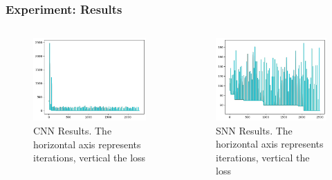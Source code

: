 \begin{frame}
	\frametitle{Experiment: Results}
	\begin{columns}
		\begin{column}{0.5\textwidth}
			\begin{figure}
				\centering
				\includegraphics[width=\linewidth]{images/cnnResults}
				\caption[CNN Results]{CNN Results. The horizontal axis represents iterations, vertical the loss }
				\label{fig:cnnresults}
			\end{figure}
			
		\end{column}
		\begin{column}{0.5\textwidth}
			\begin{figure}
				\centering
				\includegraphics[width=\linewidth]{images/snnResults}
				\caption[SNN Results]{SNN Results. The horizontal axis represents iterations, vertical the loss }
				\label{fig:snnresults}
			\end{figure}
		\end{column}
	\end{columns}
\end{frame}
